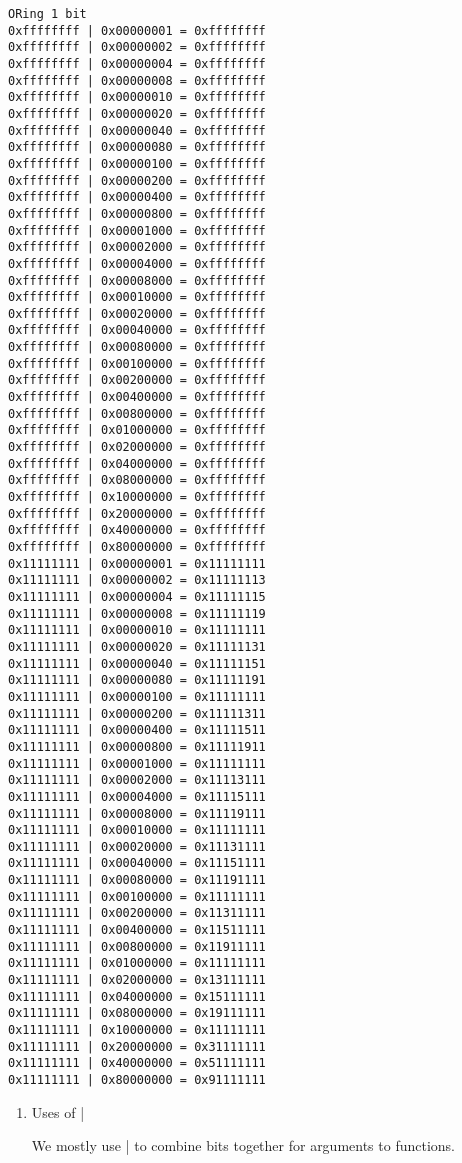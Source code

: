 \documentclass[11pt]{article}
\begin{document}
\begin{verbatim}
ORing 1 bit
0xffffffff | 0x00000001 = 0xffffffff
0xffffffff | 0x00000002 = 0xffffffff
0xffffffff | 0x00000004 = 0xffffffff
0xffffffff | 0x00000008 = 0xffffffff
0xffffffff | 0x00000010 = 0xffffffff
0xffffffff | 0x00000020 = 0xffffffff
0xffffffff | 0x00000040 = 0xffffffff
0xffffffff | 0x00000080 = 0xffffffff
0xffffffff | 0x00000100 = 0xffffffff
0xffffffff | 0x00000200 = 0xffffffff
0xffffffff | 0x00000400 = 0xffffffff
0xffffffff | 0x00000800 = 0xffffffff
0xffffffff | 0x00001000 = 0xffffffff
0xffffffff | 0x00002000 = 0xffffffff
0xffffffff | 0x00004000 = 0xffffffff
0xffffffff | 0x00008000 = 0xffffffff
0xffffffff | 0x00010000 = 0xffffffff
0xffffffff | 0x00020000 = 0xffffffff
0xffffffff | 0x00040000 = 0xffffffff
0xffffffff | 0x00080000 = 0xffffffff
0xffffffff | 0x00100000 = 0xffffffff
0xffffffff | 0x00200000 = 0xffffffff
0xffffffff | 0x00400000 = 0xffffffff
0xffffffff | 0x00800000 = 0xffffffff
0xffffffff | 0x01000000 = 0xffffffff
0xffffffff | 0x02000000 = 0xffffffff
0xffffffff | 0x04000000 = 0xffffffff
0xffffffff | 0x08000000 = 0xffffffff
0xffffffff | 0x10000000 = 0xffffffff
0xffffffff | 0x20000000 = 0xffffffff
0xffffffff | 0x40000000 = 0xffffffff
0xffffffff | 0x80000000 = 0xffffffff
0x11111111 | 0x00000001 = 0x11111111
0x11111111 | 0x00000002 = 0x11111113
0x11111111 | 0x00000004 = 0x11111115
0x11111111 | 0x00000008 = 0x11111119
0x11111111 | 0x00000010 = 0x11111111
0x11111111 | 0x00000020 = 0x11111131
0x11111111 | 0x00000040 = 0x11111151
0x11111111 | 0x00000080 = 0x11111191
0x11111111 | 0x00000100 = 0x11111111
0x11111111 | 0x00000200 = 0x11111311
0x11111111 | 0x00000400 = 0x11111511
0x11111111 | 0x00000800 = 0x11111911
0x11111111 | 0x00001000 = 0x11111111
0x11111111 | 0x00002000 = 0x11113111
0x11111111 | 0x00004000 = 0x11115111
0x11111111 | 0x00008000 = 0x11119111
0x11111111 | 0x00010000 = 0x11111111
0x11111111 | 0x00020000 = 0x11131111
0x11111111 | 0x00040000 = 0x11151111
0x11111111 | 0x00080000 = 0x11191111
0x11111111 | 0x00100000 = 0x11111111
0x11111111 | 0x00200000 = 0x11311111
0x11111111 | 0x00400000 = 0x11511111
0x11111111 | 0x00800000 = 0x11911111
0x11111111 | 0x01000000 = 0x11111111
0x11111111 | 0x02000000 = 0x13111111
0x11111111 | 0x04000000 = 0x15111111
0x11111111 | 0x08000000 = 0x19111111
0x11111111 | 0x10000000 = 0x11111111
0x11111111 | 0x20000000 = 0x31111111
0x11111111 | 0x40000000 = 0x51111111
0x11111111 | 0x80000000 = 0x91111111
\end{verbatim}

\begin{enumerate}
\item Uses of |
\label{sec:orgd8649ba}

We mostly use | to combine bits together for arguments to functions.
\end{enumerate}
\end{document}
